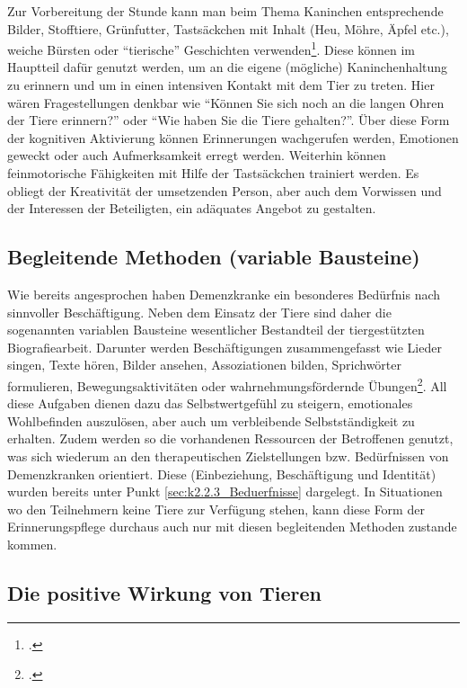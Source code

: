 Zur Vorbereitung der Stunde kann man beim Thema Kaninchen entsprechende Bilder, Stofftiere, Grünfutter, Tastsäckchen mit Inhalt (Heu, Möhre, Äpfel etc.), weiche Bürsten oder "`tierische"' Geschichten verwenden\footcite[vgl.][90-95]{Giruc2011}. Diese können im Hauptteil dafür genutzt werden, um an die eigene (mögliche) Kaninchenhaltung zu erinnern und um in einen intensiven Kontakt mit dem Tier zu treten. Hier wären Fragestellungen denkbar wie "`Können Sie sich noch an die langen Ohren der Tiere erinnern?"' oder "`Wie haben Sie die Tiere gehalten?"'. Über diese Form der kognitiven Aktivierung können Erinnerungen wachgerufen werden, Emotionen geweckt oder auch Aufmerksamkeit erregt werden. Weiterhin können feinmotorische Fähigkeiten mit Hilfe der Tastsäckchen trainiert werden. Es obliegt der Kreativität der umsetzenden Person, aber auch dem Vorwissen und der Interessen der Beteiligten, ein adäquates Angebot zu gestalten.

\subsection{Begleitende Methoden (variable Bausteine)}
\label{sec:k4.4_BegleitendeMethodenVariableBausteine}

Wie bereits angesprochen haben Demenzkranke ein besonderes Bedürfnis nach sinnvoller Beschäftigung. Neben dem Einsatz der Tiere sind daher die sogenannten variablen Bausteine wesentlicher Bestandteil der tiergestützten Biografiearbeit. Darunter werden Beschäftigungen zusammengefasst wie Lieder singen, Texte hören, Bilder ansehen, Assoziationen bilden, Sprichwörter formulieren, Bewegungsaktivitäten oder wahrnehmungsfördernde Übungen\footcite[vgl.][50f]{Giruc2011}. All diese Aufgaben dienen dazu das Selbstwertgefühl zu steigern, emotionales Wohlbefinden auszulösen, aber auch um verbleibende Selbstständigkeit zu erhalten. Zudem werden so die vorhandenen Ressourcen der Betroffenen genutzt, was sich wiederum an den therapeutischen Zielstellungen bzw. Bedürfnissen von Demenzkranken orientiert. Diese (Einbeziehung, Beschäftigung und Identität) wurden bereits unter Punkt \ref{sec:k2.2.3_Beduerfnisse} dargelegt.
In Situationen wo den Teilnehmern keine Tiere zur Verfügung stehen, kann diese Form der Erinnerungspflege durchaus auch nur mit diesen begleitenden Methoden zustande kommen.

\subsection{Die positive Wirkung von Tieren}
\label{sec:k4.5_DiePositiveWirkungVonTieren}

